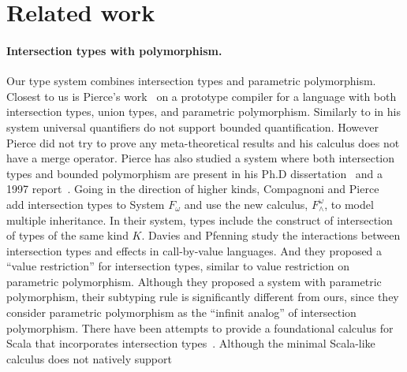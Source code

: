 \section{Related work} \label{sec:related-work}






\paragraph{Intersection types with polymorphism.}
Our type system combines intersection types and parametric polymorphism.  Closest
to us is Pierce's work~\cite{pierce1991programming1} on a prototype
compiler for a language with both intersection types, union types, and
parametric polymorphism. Similarly to \name in his system universal
quantifiers do not support bounded quantification. However Pierce did not try to prove any
meta-theoretical results and his calculus does not have a merge
operator.  Pierce has also studied a system where both intersection
types and bounded polymorphism are present in his Ph.D
dissertation~\cite{pierce1991programming2} and a 1997
report~\cite{pierce1997intersection}. Going in the direction of higher
kinds, Compagnoni and Pierce~\cite{compagnoni1996higher} add
intersection types to System $ F_{\omega} $ and use the new calculus,
$ F^{\omega}_{\wedge} $, to model multiple inheritance. In their
system, types include the construct of intersection of types of the
same kind $ K $. Davies and Pfenning
\cite{davies2000intersection} study the interactions between
intersection types and effects in call-by-value languages. And they
proposed a ``value restriction'' for intersection types, similar to
value restriction on parametric polymorphism. Although they proposed a system with 
parametric polymorphism, their subtyping rule is significantly different from ours, 
since they consider parametric polymorphism 
as the ``infinit analog'' of intersection polymorphism.
There have been attempts to provide a foundational calculus
for Scala that incorporates intersection
types~\cite{amin2014foundations,amin2012dependent}. 
Although the minimal Scala-like calculus does not natively support 
